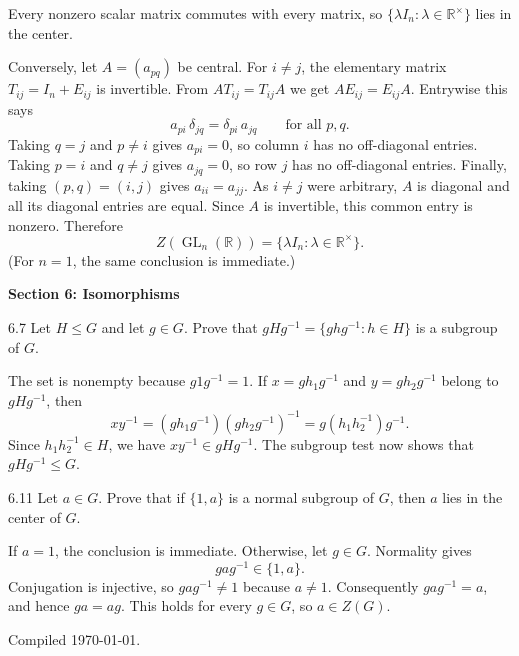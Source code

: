 \documentclass[11pt]{article}
\newcommand{\sectionheading}[1]{%
  \vspace{0.25em}
  {\color{darkgray}\large\bfseries #1}\par
}
\newcommand{\R}{\mathbb{R}}
\newcommand{\GL}{\operatorname{GL}}
\begin{document}
\begin{solution}
Every nonzero scalar matrix commutes with every matrix, so
$\{\lambda I_n:\lambda\in\R^\times\}$ lies in the center.

Conversely, let $A=(a_{pq})$ be central.  For $i\neq j$, the elementary
matrix $T_{ij}=I_n+E_{ij}$ is invertible.  From $AT_{ij}=T_{ij}A$ we get
$AE_{ij}=E_{ij}A$.  Entrywise this says
\[
  a_{pi}\,\delta_{jq}=\delta_{pi}\,a_{jq}
  \qquad\text{for all }p,q.
\]
Taking $q=j$ and $p\neq i$ gives $a_{pi}=0$, so column $i$ has no
off-diagonal entries.  Taking $p=i$ and $q\neq j$ gives $a_{jq}=0$, so
row $j$ has no off-diagonal entries.  Finally, taking $(p,q)=(i,j)$ gives
$a_{ii}=a_{jj}$.  As $i\neq j$ were arbitrary, $A$ is diagonal and all
its diagonal entries are equal.  Since $A$ is invertible, this common
entry is nonzero.  Therefore
\[
  \boxed{Z(\GL_n(\R))=\{\lambda I_n:\lambda\in\R^\times\}}.
\]
(For $n=1$, the same conclusion is immediate.)
\end{solution}

\sectionheading{Section 6: Isomorphisms}

\begin{exercise}{6.7}
Let $H\leq G$ and let $g\in G$. Prove that
$gHg^{-1}=\{ghg^{-1}:h\in H\}$ is a subgroup of $G$.
\end{exercise}

\begin{solution}
The set is nonempty because $g1g^{-1}=1$.  If
$x=gh_1g^{-1}$ and $y=gh_2g^{-1}$ belong to $gHg^{-1}$, then
\[
  xy^{-1}
  =(gh_1g^{-1})(gh_2g^{-1})^{-1}
  =g(h_1h_2^{-1})g^{-1}.
\]
Since $h_1h_2^{-1}\in H$, we have $xy^{-1}\in gHg^{-1}$.  The subgroup
test now shows that $gHg^{-1}\leq G$.
\end{solution}

\begin{exercise}{6.11}
Let $a\in G$. Prove that if $\{1,a\}$ is a normal subgroup of $G$, then
$a$ lies in the center of $G$.
\end{exercise}

\begin{solution}
If $a=1$, the conclusion is immediate.  Otherwise, let $g\in G$.  Normality
gives
\[
  gag^{-1}\in\{1,a\}.
\]
Conjugation is injective, so $gag^{-1}\neq1$ because $a\neq1$.
Consequently $gag^{-1}=a$, and hence $ga=ag$.  This holds for every
$g\in G$, so $a\in Z(G)$.
\end{solution}

\vfill
{\small\color{darkgray}Compiled \today.}
\end{document}
